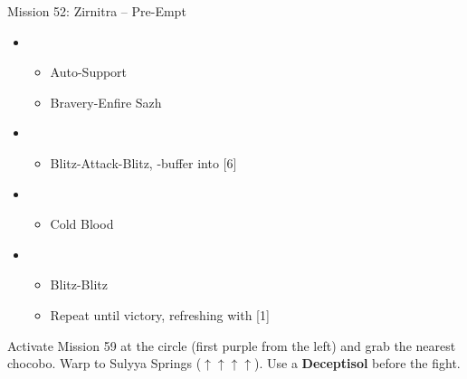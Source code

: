 \begin{battle}{Mission 52: Zirnitra -- Pre-Empt}
	\begin{itemize}
		\item \fifth
			\begin{itemize}
				\item Auto-Support
				\item Bravery-Enfire Sazh
			\end{itemize}
		\item \third
			\begin{itemize}
				\item Blitz-Attack-Blitz, \rav-buffer into [6]
			\end{itemize}
		\item \sixth
			\begin{itemize}
				\item Cold Blood
			\end{itemize}
		\item \second
			\begin{itemize}
				\item Blitz-Blitz
				\item Repeat until victory, refreshing with [1]
			\end{itemize}
	\end{itemize}
\end{battle}

Activate Mission 59 at the circle (first purple from the left) and grab the nearest chocobo.
Warp to Sulyya Springs ($\uparrow\uparrow\uparrow\uparrow$).
Use a \textbf{Deceptisol} before the fight.

